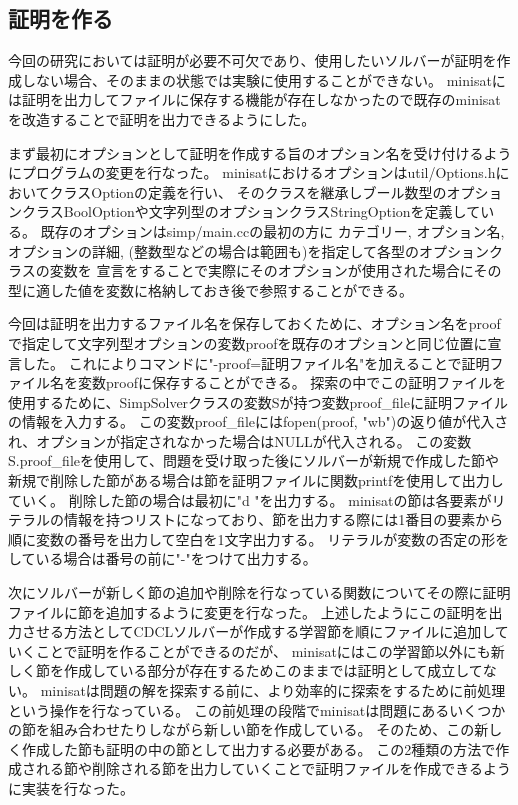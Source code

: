 \documentclass[titlepage]{jsarticle}
\begin{document}
\subsection{証明を作る}






今回の研究においては証明が必要不可欠であり、使用したいソルバーが証明を作成しない場合、そのままの状態では実験に使用することができない。
minisatには証明を出力してファイルに保存する機能が存在しなかったので既存のminisatを改造することで証明を出力できるようにした。

まず最初にオプションとして証明を作成する旨のオプション名を受け付けるようにプログラムの変更を行なった。
minisatにおけるオプションはutil/Options.hにおいてクラスOptionの定義を行い、
そのクラスを継承しブール数型のオプションクラスBoolOptionや文字列型のオプションクラスStringOptionを定義している。
既存のオプションはsimp/main.ccの最初の方に
カテゴリー, オプション名, オプションの詳細, (整数型などの場合は範囲も)を指定して各型のオプションクラスの変数を
宣言をすることで実際にそのオプションが使用された場合にその型に適した値を変数に格納しておき後で参照することができる。

今回は証明を出力するファイル名を保存しておくために、オプション名をproofで指定して文字列型オプションの変数proofを既存のオプションと同じ位置に宣言した。
これによりコマンドに"-proof=証明ファイル名"を加えることで証明ファイル名を変数proofに保存することができる。
探索の中でこの証明ファイルを使用するために、SimpSolverクラスの変数Sが持つ変数proof\_fileに証明ファイルの情報を入力する。
この変数proof\_fileにはfopen(proof, "wb")の返り値が代入され、オプションが指定されなかった場合はNULLが代入される。
この変数S.proof\_fileを使用して、問題を受け取った後にソルバーが新規で作成した節や新規で削除した節がある場合は節を証明ファイルに関数printfを使用して出力していく。
削除した節の場合は最初に"d "を出力する。
minisatの節は各要素がリテラルの情報を持つリストになっており、節を出力する際には1番目の要素から順に変数の番号を出力して空白を1文字出力する。
リテラルが変数の否定の形をしている場合は番号の前に"-"をつけて出力する。

次にソルバーが新しく節の追加や削除を行なっている関数についてその際に証明ファイルに節を追加するように変更を行なった。
上述したようにこの証明を出力させる方法としてCDCLソルバーが作成する学習節を順にファイルに追加していくことで証明を作ることができるのだが、
minisatにはこの学習節以外にも新しく節を作成している部分が存在するためこのままでは証明として成立してない。
minisatは問題の解を探索する前に、より効率的に探索をするために前処理という操作を行なっている。
この前処理の段階でminisatは問題にあるいくつかの節を組み合わせたりしながら新しい節を作成している。
そのため、この新しく作成した節も証明の中の節として出力する必要がある。
この2種類の方法で作成される節や削除される節を出力していくことで証明ファイルを作成できるように実装を行なった。
\end{document}
